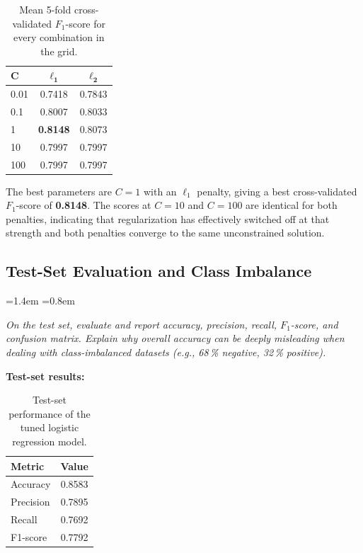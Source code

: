 \documentclass[12pt,a4paper]{article}
\newcommand{\qtext}[1]{%
  \begin{list}{}{\leftmargin=1.4em \rightmargin=0.8em
                 \topsep=3pt \parsep=0pt \itemsep=0pt}
  \item[]\itshape #1
  \end{list}}
\begin{document}
\begin{table}[H]
\centering
\caption{Mean 5-fold cross-validated $F_1$-score for every combination in the grid.}
\label{tab:grid}
\begin{tabular}{lcc}
\toprule
$\boldsymbol{C}$ & $\boldsymbol{\ell_1}$ & $\boldsymbol{\ell_2}$ \\
\midrule
0.01 & 0.7418 & 0.7843 \\
0.1  & 0.8007 & 0.8033 \\
1    & \textbf{0.8148} & 0.8073 \\
10   & 0.7997 & 0.7997 \\
100  & 0.7997 & 0.7997 \\
\bottomrule
\end{tabular}
\end{table}

The best parameters are $C = 1$ with an $\ell_1$ penalty, giving a best cross-validated
$F_1$-score of \textbf{0.8148}. The scores at $C = 10$ and $C = 100$ are identical for both
penalties, indicating that regularization has effectively switched off at that strength and both
penalties converge to the same unconstrained solution.

\subsection{Test-Set Evaluation and Class Imbalance}

\qtext{On the test set, evaluate and report accuracy, precision, recall, $F_1$-score, and
confusion matrix. Explain why overall accuracy can be deeply misleading when dealing with
class-imbalanced datasets (e.g., 68\,\% negative, 32\,\% positive).}





\textbf{Test-set results:}

\begin{table}[H]
\centering
\caption{Test-set performance of the tuned logistic regression model.}
\label{tab:metrics}
\begin{tabular}{lc}
\toprule
\textbf{Metric} & \textbf{Value} \\
\midrule
Accuracy  & 0.8583 \\
Precision & 0.7895 \\
Recall    & 0.7692 \\
F1-score  & 0.7792 \\
\bottomrule
\end{tabular}
\end{table}
\end{document}

